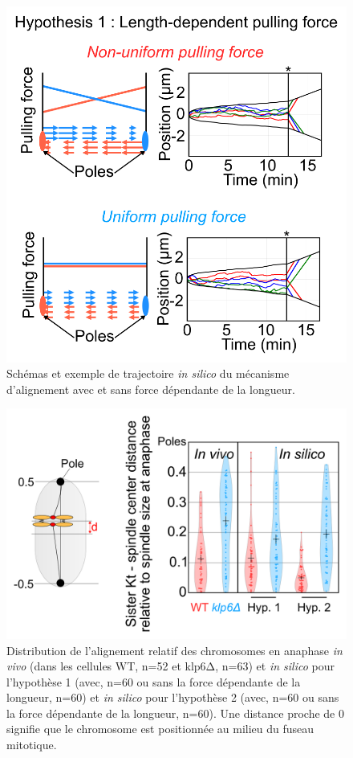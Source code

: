 \documentclass[12pt,a4paper,twoside,openright]{book}
\begin{document}
\begin{figure}[htbp]
\centering
\includegraphics{figures/results/modelling/hyp1.png}
\caption{\label{fig:hyp1}Schémas et exemple de trajectoire \emph{in
silico} du mécanisme d'alignement avec et sans force dépendante de la
longueur.}
\end{figure}

\begin{figure}[htbp]
\centering
\includegraphics{figures/results/modelling/ch_alignment.png}
\caption{\label{fig:ch-alignment}Distribution de l'alignement relatif
des chromosomes en anaphase \emph{in vivo} (dans les cellules WT, n=52
et klp6Δ, n=63) et \emph{in silico} pour l'hypothèse 1 (avec, n=60 ou
sans la force dépendante de la longueur, n=60) et \emph{in silico} pour
l'hypothèse 2 (avec, n=60 ou sans la force dépendante de la longueur,
n=60). Une distance proche de 0 signifie que le chromosome est
positionnée au milieu du fuseau mitotique.}
\end{figure}
\end{document}
